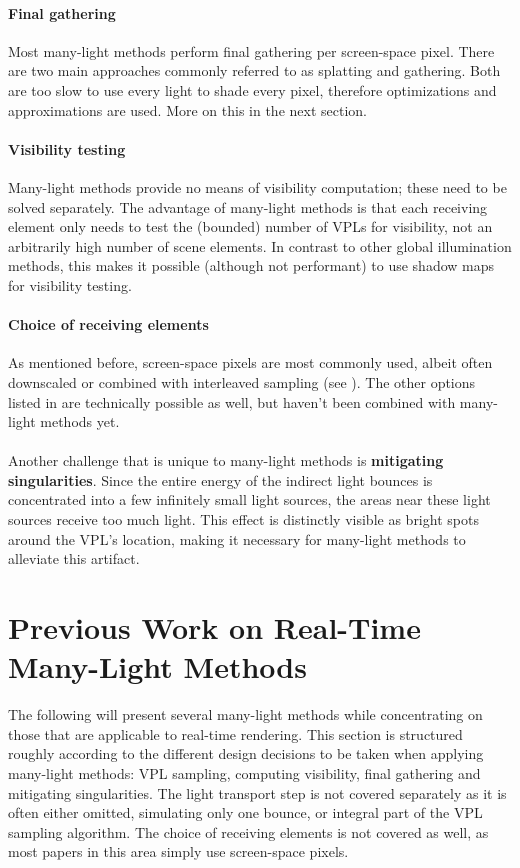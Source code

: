 \paragraph{Final gathering}
Most many-light methods perform final gathering per screen-space pixel. There are two main approaches commonly referred to as splatting and gathering. Both are too slow to use every light to shade every pixel, therefore optimizations and approximations are used. More on this in the next section.

\paragraph{Visibility testing}
Many-light methods provide no means of visibility computation; these need to be solved separately. The advantage of many-light methods is that each receiving element only needs to test the (bounded) number of VPLs for visibility, not an arbitrarily high number of scene elements. In contrast to other global illumination methods, this makes it possible (although not performant) to use shadow maps for visibility testing.

\paragraph{Choice of receiving elements}
As mentioned before, screen-space pixels are most commonly used, albeit often downscaled or combined with interleaved sampling (see ). The other options listed in  are technically possible as well, but haven't been combined with many-light methods yet.
\\
\\
Another challenge that is unique to many-light methods is \textbf{mitigating singularities}. Since the entire energy of the indirect light bounces is concentrated into a few infinitely small light sources, the areas near these light sources receive too much light. This effect is distinctly visible as bright spots around the VPL's location, making it necessary for many-light methods to alleviate this artifact.



\section{Previous Work on Real-Time Many-Light Methods}
\label{sec:intro:relatedWorkManyLight}

The following will present several many-light methods while concentrating on those that are applicable to real-time rendering. This section is structured roughly according to the different design decisions to be taken when applying many-light methods: VPL sampling, computing visibility, final gathering and mitigating singularities. The light transport step is not covered separately as it is often either omitted, simulating only one bounce, or integral part of the VPL sampling algorithm. The choice of receiving elements is not covered as well, as most papers in this area simply use screen-space pixels.

